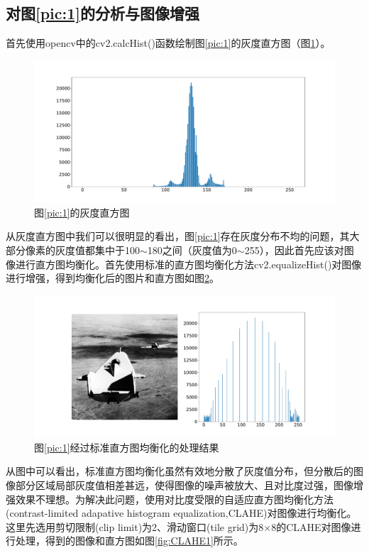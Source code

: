 \documentclass[a4paper]{ctexart}
\begin{document}
\begin{spacing}{1.35}
	\subsection{对图\ref{pic:1}的分析与图像增强}\label{sec:处理1}
	首先使用opencv中的cv2.calcHist()函数绘制图\ref{pic:1}的灰度直方图（图\ref{fig:灰度直方图1}）。
	\begin{figure}[htbp]
		\centering
		\includegraphics[width=\textwidth]{figure/hist_1.pdf}
		\caption{图\ref{pic:1}的灰度直方图}\label{fig:灰度直方图1}
	\end{figure}
	从灰度直方图中我们可以很明显的看出，图\ref{pic:1}存在灰度分布不均的问题，其大部分像素的灰度值都集中于100$\sim$180之间（灰度值为0$\sim$255），因此首先应该对图像进行直方图均衡化。首先使用标准的直方图均衡化方法cv2.equalizeHist()对图像进行增强，得到均衡化后的图片和直方图如图\ref{fig:标准直方图均衡化}。
	\begin{figure}[htbp]
		\centering
		\includegraphics[width=\textwidth]{figure/eqhist_1.pdf}
		\caption{图\ref{pic:1}经过标准直方图均衡化的处理结果}\label{fig:标准直方图均衡化}
	\end{figure}
	从图中可以看出，标准直方图均衡化虽然有效地分散了灰度值分布，但分散后的图像部分区域局部灰度值相差甚远，使得图像的噪声被放大、且对比度过强，图像增强效果不理想。为解决此问题，使用对比度受限的自适应直方图均衡化方法(contrast-limited adapative histogram equalization,CLAHE)\cite{RN150}\cite{RN153}对图像进行均衡化。这里先选用剪切限制(clip limit)为2、滑动窗口(tile grid)为8$\times$8的CLAHE对图像进行处理，得到的图像和直方图如图\ref{fig:CLAHE1}所示。

\end{spacing}
\end{document}
